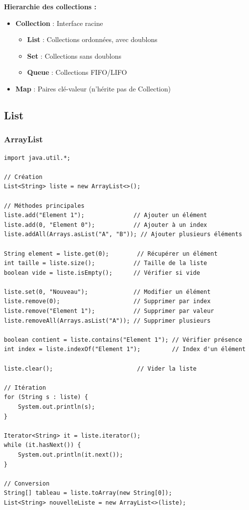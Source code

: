 \documentclass[11pt,a4paper]{article}
\begin{document}
\begin{importantbox}
\textbf{Hierarchie des collections :}
\begin{itemize}
    \item \textbf{Collection} : Interface racine
    \begin{itemize}
        \item \textbf{List} : Collections ordonnées, avec doublons
        \item \textbf{Set} : Collections sans doublons
        \item \textbf{Queue} : Collections FIFO/LIFO
    \end{itemize}
    \item \textbf{Map} : Paires clé-valeur (n'hérite pas de Collection)
\end{itemize}
\end{importantbox}

\subsection{List}

\subsubsection{ArrayList}

\begin{lstlisting}
import java.util.*;

// Création
List<String> liste = new ArrayList<>();

// Méthodes principales
liste.add("Element 1");              // Ajouter un élément
liste.add(0, "Element 0");           // Ajouter à un index
liste.addAll(Arrays.asList("A", "B")); // Ajouter plusieurs éléments

String element = liste.get(0);        // Récupérer un élément
int taille = liste.size();           // Taille de la liste
boolean vide = liste.isEmpty();      // Vérifier si vide

liste.set(0, "Nouveau");             // Modifier un élément
liste.remove(0);                     // Supprimer par index
liste.remove("Element 1");           // Supprimer par valeur
liste.removeAll(Arrays.asList("A")); // Supprimer plusieurs

boolean contient = liste.contains("Element 1"); // Vérifier présence
int index = liste.indexOf("Element 1");         // Index d'un élément

liste.clear();                        // Vider la liste

// Itération
for (String s : liste) {
    System.out.println(s);
}

Iterator<String> it = liste.iterator();
while (it.hasNext()) {
    System.out.println(it.next());
}

// Conversion
String[] tableau = liste.toArray(new String[0]);
List<String> nouvelleListe = new ArrayList<>(liste);
\end{lstlisting}
\end{document}
